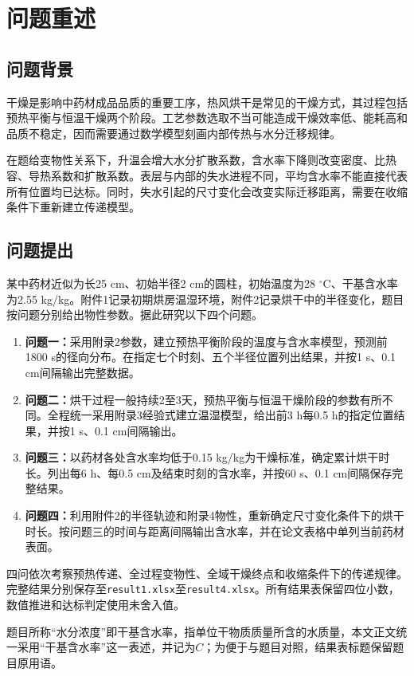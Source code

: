 \section{问题重述}
\subsection{问题背景}
干燥是影响中药材成品品质的重要工序，热风烘干是常见的干燥方式，其过程包括预热平衡与恒温干燥两个阶段。工艺参数选取不当可能造成干燥效率低、能耗高和品质不稳定，因而需要通过数学模型刻画内部传热与水分迁移规律。

在题给变物性关系下，升温会增大水分扩散系数，含水率下降则改变密度、比热容、导热系数和扩散系数。表层与内部的失水进程不同，平均含水率不能直接代表所有位置均已达标。同时，失水引起的尺寸变化会改变实际迁移距离，需要在收缩条件下重新建立传递模型。

\subsection{问题提出}
某中药材近似为长25 cm、初始半径2 cm的圆柱，初始温度为28 $^\circ$C、干基含水率为2.55 kg/kg。附件1记录初期烘房温湿环境，附件2记录烘干中的半径变化，题目按问题分别给出物性参数。据此研究以下四个问题。

\begin{enumerate}
\item \textbf{问题一：}采用附录2参数，建立预热平衡阶段的温度与含水率模型，预测前1800 s的径向分布。在指定七个时刻、五个半径位置列出结果，并按1 s、0.1 cm间隔输出完整数据。
\item \textbf{问题二：}烘干过程一般持续2至3天，预热平衡与恒温干燥阶段的参数有所不同。全程统一采用附录3经验式建立温湿模型，给出前3 h每0.5 h的指定位置结果，并按1 s、0.1 cm间隔输出。
\item \textbf{问题三：}以药材各处含水率均低于0.15 kg/kg为干燥标准，确定累计烘干时长。列出每6 h、每0.5 cm及结束时刻的含水率，并按60 s、0.1 cm间隔保存完整结果。
\item \textbf{问题四：}利用附件2的半径轨迹和附录4物性，重新确定尺寸变化条件下的烘干时长。按问题三的时间与距离间隔输出含水率，并在论文表格中单列当前药材表面。
\end{enumerate}

四问依次考察预热传递、全过程变物性、全域干燥终点和收缩条件下的传递规律。完整结果分别保存至\texttt{result1.xlsx}至\texttt{result4.xlsx}。所有结果表保留四位小数，数值推进和达标判定使用未舍入值。

题目所称“水分浓度”即干基含水率，指单位干物质质量所含的水质量，本文正文统一采用“干基含水率”这一表述，并记为$C$；为便于与题目对照，结果表标题保留题目原用语。

\FloatBarrier
